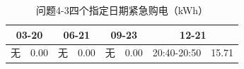 \begin{table}[H]\centering\small\caption{问题4-3四个指定日期紧急购电（kWh）}\label{tab:q4_3e}
\begin{tabular}{lrlrlrlr}\toprule
\multicolumn{2}{c}{03-20} & \multicolumn{2}{c}{06-21} & \multicolumn{2}{c}{09-23} & \multicolumn{2}{c}{12-21}\\\midrule
无 & 0.00 & 无 & 0.00 & 无 & 0.00 & 20:40-20:50 & 15.71\\
\bottomrule\end{tabular}\end{table}
